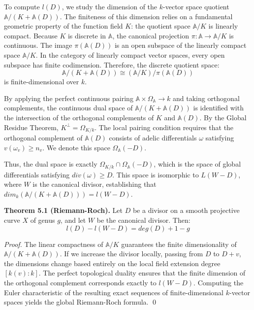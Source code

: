 \documentclass[12pt]{article}
\begin{document}
To compute $l(D)$, we study the dimension of the $k$-vector space quotient $\mathbb{A}/(K+\mathbb{A}(D))$. The finiteness of this dimension relies on a fundamental geometric property of the function field $K$: the quotient space $\mathbb{A}/K$ is linearly compact. Because $K$ is discrete in $\mathbb{A}$, the canonical projection $\pi:\mathbb{A}\rightarrow\mathbb{A}/K$ is continuous. The image $\pi(\mathbb{A}(D))$ is an open subspace of the linearly compact space $\mathbb{A}/K$. In the category of linearly compact vector spaces, every open subspace has finite codimension. Therefore, the discrete quotient space:
$$\mathbb{A}/(K+\mathbb{A}(D))\cong(\mathbb{A}/K)/\pi(\mathbb{A}(D))$$
is finite-dimensional over $k$.

By applying the perfect continuous pairing $\mathbb{A}\times\Omega_{\mathbb{A}}\rightarrow k$ and taking orthogonal complements, the continuous dual space of $\mathbb{A}/(K+\mathbb{A}(D))$ is identified with the intersection of the orthogonal complements of $K$ and $\mathbb{A}(D)$. By the Global Residue Theorem, $K^{\perp}=\Omega_{K/k}$. The local pairing condition requires that the orthogonal complement of $\mathbb{A}(D)$ consists of adelic differentials $\omega$ satisfying $v(\omega_{v})\ge n_{v}$. We denote this space $\Omega_{\mathbb{A}}(-D)$.

Thus, the dual space is exactly $\Omega_{K/k}\cap\Omega_{\mathbb{A}}(-D)$, which is the space of global differentials satisfying $div(\omega)\ge D$. This space is isomorphic to $L(W-D)$, where $W$ is the canonical divisor, establishing that $dim_{k}(\mathbb{A}/(K+\mathbb{A}(D)))=l(W-D)$.

\textbf{Theorem 5.1 (Riemann-Roch).} Let $D$ be a divisor on a smooth projective curve $X$ of genus $g$, and let $W$ be the canonical divisor. Then:
$$l(D)-l(W-D)=deg(D)+1-g$$

\textit{Proof.} The linear compactness of $\mathbb{A}/K$ guarantees the finite dimensionality of $\mathbb{A}/(K+\mathbb{A}(D))$. If we increase the divisor locally, passing from $D$ to $D+v$, the dimensions change based entirely on the local field extension degree $[k(v):k]$. The perfect topological duality ensures that the finite dimension of the orthogonal complement corresponds exactly to $l(W-D)$. Computing the Euler characteristic of the resulting exact sequences of finite-dimensional $k$-vector spaces yields the global Riemann-Roch formula. \qed
\end{document}
